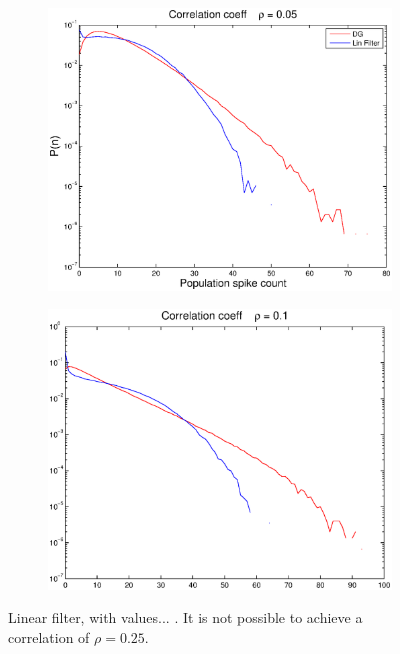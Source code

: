 \documentclass[11pt]{article}
\begin{document}
\begin{figure}[H]
	\centering
	\begin{subfigure}[h]{0.49\textwidth}
	\centering
	\includegraphics[width=\textwidth]{../Figures/Lin_Filter/Filt_DG_indiv_lin_mu_01_rho_05}
	\label{fig11}
	\end{subfigure}
	\begin{subfigure}[h]{0.49\textwidth}
	\centering
	\includegraphics[width=\textwidth]{../Figures/Lin_Filter/Filt_DG_indiv_lin_mu_01_rho_1}
	\label{fig11}
	\end{subfigure}
	\caption{\footnotesize Linear filter, with values... . It is not possible to achieve a correlation of $\rho = 0.25$.}
\end{figure}
\end{document}
